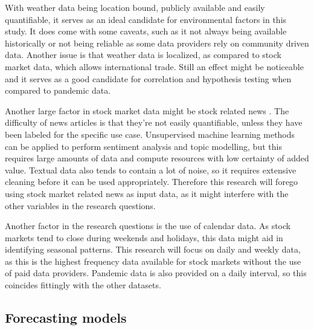 With weather data being location bound, publicly available and easily quantifiable, it serves as an ideal candidate for environmental factors in this study. It does come with some caveats, such as it not always being available historically or not being reliable as some data providers rely on community driven data. Another issue is that weather data is localized, as compared to stock market data, which allows international trade. Still an effect might be noticeable and it serves as a good candidate for correlation and hypothesis testing when compared to pandemic data.

Another large factor in stock market data might be stock related news \cite{tversky1974judgment, veronesi1999stock}. The difficulty of news articles is that they're not easily quantifiable, unless they have been labeled for the specific use case. Unsupervised machine learning methods can be applied to perform sentiment analysis and topic modelling, but this requires large amounts of data and compute resources with low certainty of added value. Textual data also tends to contain a lot of noise, so it requires extensive cleaning before it can be used appropriately. Therefore this research will forego using stock market related news as input data, as it might interfere with the other variables in the research questions.

Another factor in the research questions is the use of calendar data. As stock markets tend to close during weekends and holidays, this data might aid in identifying seasonal patterns. This research will focus on daily and weekly data, as this is the highest frequency data available for stock markets without the use of paid data providers. Pandemic data is also provided on a daily interval, so this coincides fittingly with the other datasets.



\subsection{Forecasting models}

